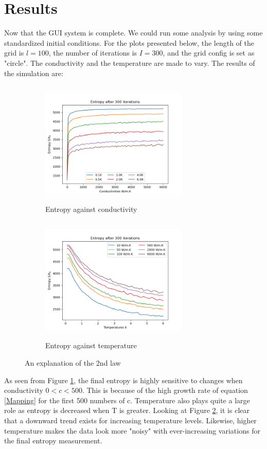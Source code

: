 \section{Results}
Now that the GUI system is complete. We could run some analysis by using some standardized initial conditions. For the plots presented below, the length of the grid is $l=100$, the number of iterations is $I=300$, and the grid config is set as "circle". The conductivity and the temperature are made to vary. The results of the simulation are:
\begin{figure}[H]
     \centering
     \begin{subfigure}[h]{0.3\textwidth}
         \centering
         \includegraphics[width=7cm,height=6cm]{images/Entropy_after_300_legend=T.png}
         \caption{Entropy against conductivity}
         \label{fig:directions_1}
     \end{subfigure}
      \hspace{3cm}
     \begin{subfigure}[h]{0.3\textwidth}
         \centering
         \includegraphics[width=7cm,height=6cm]{images/Entropy_after_300_legend=C.png}
         \caption{Entropy against temperature}
         \label{fig:directions_2}
     \end{subfigure}
        \caption{An explanation of the 2nd law}
        \label{fig:valid_directions}
\end{figure}
As seen from Figure \ref{fig:directions_1}, the final entropy is highly sensitive to changes when conductivity $0<c<500$. This is because of the high growth rate of equation \ref{Mapping} for the first 500 numbers of c. Temperature also plays quite a large role as entropy is decreased when T is greater. Looking at Figure \ref{fig:directions_2}, it is clear that a downward trend exists for increasing temperature levels. Likewise, higher temperature makes the data look more "noisy" with ever-increasing variations for the final entropy measurement. \par

